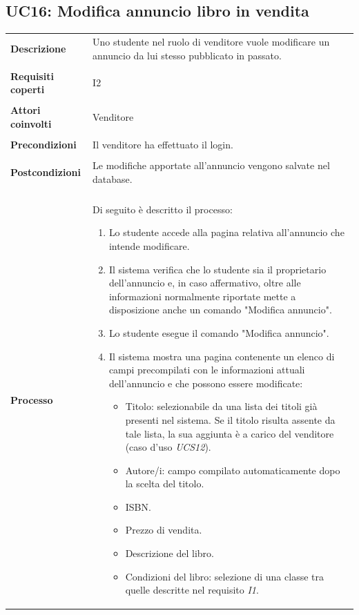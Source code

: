 \documentclass[10pt,a4paper]{report}
\begin{document}
	\subsection{UC16: Modifica annuncio libro in vendita}
	\begin{tabular}{lp{}}
		\textbf{Descrizione}&Uno studente nel ruolo di venditore vuole modificare un annuncio da lui stesso pubblicato in passato.\\
		\\
		\textbf{Requisiti coperti}&I2\\
		\\
		\textbf{Attori coinvolti}&Venditore\\
		\\
		\textbf{Precondizioni}&Il venditore ha effettuato il login.\\
		\\
		\textbf{Postcondizioni}&Le modifiche apportate all'annuncio vengono salvate nel database.\\
		\\
		\textbf{Processo}&Di seguito è descritto il processo:
		\begin{enumerate}
			\item Lo studente accede alla pagina relativa all'annuncio che intende modificare.
			\item Il sistema verifica che lo studente sia il proprietario dell'annuncio e, in caso affermativo, oltre alle informazioni normalmente riportate mette a disposizione anche un comando "Modifica annuncio".
			\item Lo studente esegue il comando "Modifica annuncio".
			\item Il sistema mostra una pagina contenente un elenco di campi precompilati con le informazioni attuali dell'annuncio e che possono essere modificate:
			\begin{itemize}
				\item Titolo: selezionabile da una lista dei titoli già presenti nel sistema. Se il titolo risulta assente da tale lista, la sua aggiunta è a carico del venditore (caso d'uso \textit{UCS12}).
				\item Autore/i: campo compilato automaticamente dopo la scelta del titolo.
				\item ISBN.
				\item Prezzo di vendita.
				\item Descrizione del libro.
				\item Condizioni del libro: selezione di una classe tra quelle descritte nel requisito \textit{I1}.

\end{itemize}
\end{enumerate}
\end{tabular}
\end{document}
